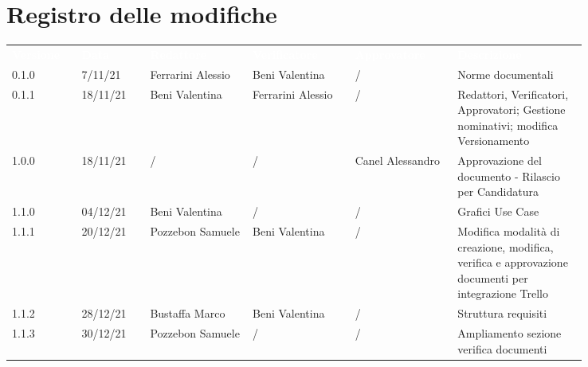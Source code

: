 \section*{Registro delle modifiche}

{\renewcommand{\arraystretch}{1.5}
\scriptsize
\begin{tabular}{p{0.10\linewidth}p{0.10\linewidth}p{0.15\linewidth}p{0.15\linewidth}p{0.15\linewidth}p{0.19\linewidth}}
	\rowcolor[RGB]{33, 73, 50}
	\textcolor{white}{\textbf{Versione}} & \textcolor{white}{\textbf{Data}} & \textcolor{white}
	{\textbf{Redattore}} & \textcolor{white}{\textbf{Verificatore}} & \textcolor{white}{\textbf{Approvatore}} & \textcolor{white}
	{\textbf{Descrizione}}\\
	\rowcolor[RGB]{216, 235, 171}
	0.1.0 & 7/11/21 & Ferrarini Alessio & Beni Valentina & / & Norme documentali\\
	\rowcolor[RGB]{233, 245, 206}
	0.1.1 & 18/11/21 & Beni Valentina & Ferrarini Alessio & / & Redattori, Verificatori, Approvatori; Gestione nominativi; modifica Versionamento\\
	\rowcolor[RGB]{216, 235, 171}
	1.0.0 & 18/11/21 & / & / & Canel Alessandro & Approvazione del documento - Rilascio per Candidatura\\
	\rowcolor[RGB]{233, 245, 206}
	1.1.0 & 04/12/21 & Beni Valentina & / & / & Grafici Use Case \\
	\rowcolor[RGB]{216, 235, 171}
	1.1.1 & 20/12/21 & Pozzebon Samuele & Beni Valentina & / & Modifica modalità di	creazione, modifica, verifica e approvazione documenti per integrazione Trello\\
	\rowcolor[RGB]{233, 245, 206}
	1.1.2 & 28/12/21 & Bustaffa Marco & Beni Valentina & / & Struttura requisiti\\
	\rowcolor[RGB]{216, 235, 171}
	1.1.3 & 30/12/21 & Pozzebon Samuele & / & / & Ampliamento sezione verifica documenti
\end{tabular}	
}